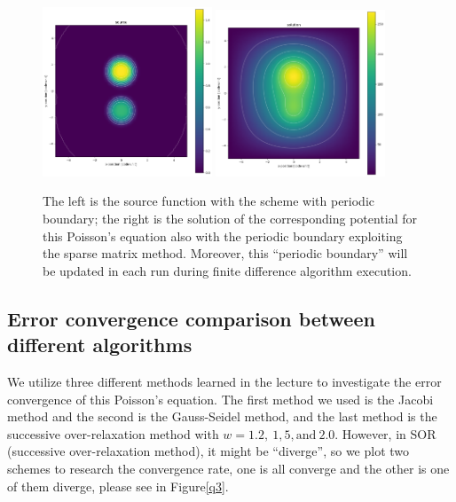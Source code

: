 \documentclass[12pt]{article}
\begin{document}
    \begin{figure}[H]
        \centering
        \includegraphics[width = 0.45\textwidth]{./fig/2.1.png}
        \includegraphics[width = 0.45\textwidth]{./fig/2.2.png}
        \caption{The left is the source function with the scheme with periodic boundary; the right is the solution of the corresponding potential for this Poisson's equation also with the periodic boundary exploiting the sparse matrix method. Moreover, this ``periodic boundary'' will be updated in each run during finite difference algorithm execution.}
    \end{figure}

    \subsection{Error convergence comparison between different algorithms}
    We utilize three different methods learned in the lecture to investigate the error convergence of this Poisson's equation. The first method we used is the Jacobi method and the second is the Gauss-Seidel method, and the last method is the successive over-relaxation method with $w = 1.2,\ 1,5,\text{and}\ 2.0$. However, in SOR (successive over-relaxation method), it might be ``diverge'', so we plot two schemes to research the convergence rate, one is all converge and the other is one of them diverge, please see in Figure\ref{q3}.
\end{document}
